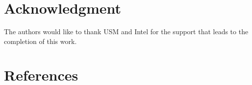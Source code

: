 \documentclass[review]{elsarticle}
\begin{document}
\section*{Acknowledgment}
The authors would like to thank USM and Intel for the support that leads to the completion of this work.


\section*{References}


\end{document}
